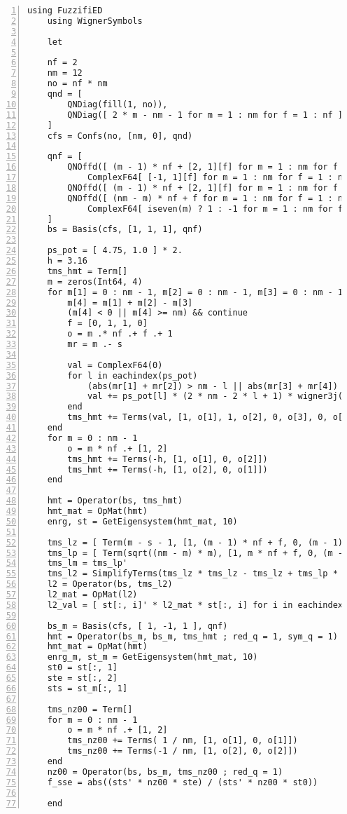 \documentclass{timesjhep}
\begin{document}
\begin{lstlisting}[numbers=left]
    using FuzzifiED
    using WignerSymbols

    let

    nf = 2
    nm = 12
    no = nf * nm
    qnd = [
        QNDiag(fill(1, no)),
        QNDiag([ 2 * m - nm - 1 for m = 1 : nm for f = 1 : nf ])
    ]
    cfs = Confs(no, [nm, 0], qnd)

    qnf = [
        QNOffd([ (m - 1) * nf + [2, 1][f] for m = 1 : nm for f = 1 : nf ], true,
            ComplexF64[ [-1, 1][f] for m = 1 : nm for f = 1 : nf ]),
        QNOffd([ (m - 1) * nf + [2, 1][f] for m = 1 : nm for f = 1 : nf ]),
        QNOffd([ (nm - m) * nf + f for m = 1 : nm for f = 1 : nf],
            ComplexF64[ iseven(m) ? 1 : -1 for m = 1 : nm for f = 1 : nf ])
    ]
    bs = Basis(cfs, [1, 1, 1], qnf)

    ps_pot = [ 4.75, 1.0 ] * 2.
    h = 3.16
    tms_hmt = Term[]
    m = zeros(Int64, 4)
    for m[1] = 0 : nm - 1, m[2] = 0 : nm - 1, m[3] = 0 : nm - 1
        m[4] = m[1] + m[2] - m[3]
        (m[4] < 0 || m[4] >= nm) && continue
        f = [0, 1, 1, 0]
        o = m .* nf .+ f .+ 1
        mr = m .- s

        val = ComplexF64(0)
        for l in eachindex(ps_pot)
            (abs(mr[1] + mr[2]) > nm - l || abs(mr[3] + mr[4]) > nm - l) && break
            val += ps_pot[l] * (2 * nm - 2 * l + 1) * wigner3j(s, s, nm - l, mr[1], mr[2], -mr[1] - mr[2]) * wigner3j(s, s, nm - l, mr[4], mr[3], -mr[3] - mr[4])
        end
        tms_hmt += Terms(val, [1, o[1], 1, o[2], 0, o[3], 0, o[4]])
    end
    for m = 0 : nm - 1
        o = m * nf .+ [1, 2]
        tms_hmt += Terms(-h, [1, o[1], 0, o[2]])
        tms_hmt += Terms(-h, [1, o[2], 0, o[1]])
    end

    hmt = Operator(bs, tms_hmt)
    hmt_mat = OpMat(hmt)
    enrg, st = GetEigensystem(hmt_mat, 10)

    tms_lz = [ Term(m - s - 1, [1, (m - 1) * nf + f, 0, (m - 1) * nf + f]) for m = 1 : nm for f = 1 : nf ]
    tms_lp = [ Term(sqrt((nm - m) * m), [1, m * nf + f, 0, (m - 1) * nf + f]) for m = 1 : nm - 1 for f = 1 : nf ]
    tms_lm = tms_lp'
    tms_l2 = SimplifyTerms(tms_lz * tms_lz - tms_lz + tms_lp * tms_lm)
    l2 = Operator(bs, tms_l2)
    l2_mat = OpMat(l2)
    l2_val = [ st[:, i]' * l2_mat * st[:, i] for i in eachindex(enrg)]

    bs_m = Basis(cfs, [ 1, -1, 1 ], qnf)
    hmt = Operator(bs_m, bs_m, tms_hmt ; red_q = 1, sym_q = 1)
    hmt_mat = OpMat(hmt)
    enrg_m, st_m = GetEigensystem(hmt_mat, 10)
    st0 = st[:, 1]
    ste = st[:, 2]
    sts = st_m[:, 1]

    tms_nz00 = Term[]
    for m = 0 : nm - 1
        o = m * nf .+ [1, 2]
        tms_nz00 += Terms( 1 / nm, [1, o[1], 0, o[1]])
        tms_nz00 += Terms(-1 / nm, [1, o[2], 0, o[2]])
    end
    nz00 = Operator(bs, bs_m, tms_nz00 ; red_q = 1)
    f_sse = abs((sts' * nz00 * ste) / (sts' * nz00 * st0))

    end
\end{lstlisting}
\end{document}

